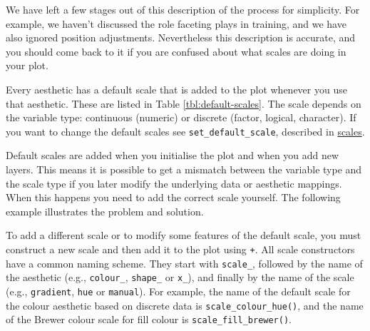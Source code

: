We have left a few stages out of this description of the process for
simplicity. For example, we haven't discussed the role faceting plays in
training, and we have also ignored position adjustments. Nevertheless
this description is accurate, and you should come back to it if you are
confused about what scales are doing in your plot.


Every aesthetic has a default scale that is added to the plot whenever
you use that aesthetic. These are listed in Table
\ref{tbl:default-scales}. The scale depends on the variable type:
continuous (numeric) or discrete (factor, logical, character). If you
want to change the default scales see \texttt{set\_default\_scale},
described in \hyperref[sub:customise-scales]{scales}.

Default scales are added when you initialise the plot and when you add
new layers. This means it is possible to get a mismatch between the
variable type and the scale type if you later modify the underlying data
or aesthetic mappings. When this happens you need to add the correct
scale yourself. The following example illustrates the problem and
solution. 

\begin{Shaded}
\begin{Highlighting}[]
\StringTok{ } 

\StringTok{ }\NormalTok{(} 

\StringTok{ }\NormalTok{(} \StringTok{ }\NormalTok{()}
\end{Highlighting}
\end{Shaded}

To add a different scale or to modify some features of the default
scale, you must construct a new scale and then add it to the plot using
\texttt{+}. \indexc{+} All scale constructors have a common naming
scheme. They start with \texttt{scale\_}, followed by the name of the
aesthetic (e.g., \texttt{colour\_}, \texttt{shape\_} or \texttt{x\_}),
and finally by the name of the scale (e.g., \texttt{gradient},
\texttt{hue} or \texttt{manual}). For example, the name of the default
scale for the colour aesthetic based on discrete data is
\texttt{scale\_colour\_hue()}, and the name of the Brewer colour scale
for fill colour is \texttt{scale\_fill\_brewer()}. 

